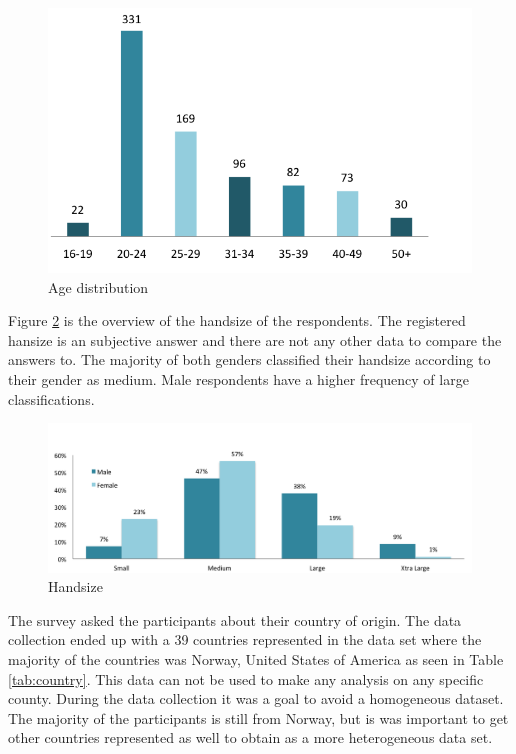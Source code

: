     \begin{figure}[H]
      \centering
      \includegraphics[scale=0.8]{pics/analysis/AgeDist.png}
      \caption{Age distribution}
      \label{fig:ageDistribution}
    \end{figure}

    Figure  \ref{fig:handsizepopulation} is the overview of the handsize of the respondents. The registered hansize is an subjective answer and there are not any other data to compare the answers to. The majority of both genders classified their handsize according to their gender as medium. Male respondents have a higher frequency of large classifications. 

    \begin{figure}[H]
      \centering
      \includegraphics[width=\textwidth]{pics/infographics/mobilesize.png}
      \caption{Handsize}
      \label{fig:handsizepopulation}
    \end{figure}

    The survey asked the participants about their country of origin. The data collection ended up with a 39 countries represented in the data set where the majority of the countries was Norway, United States of America as seen in Table \ref{tab:country}. This data can not be used to make any analysis on any specific county. During the data collection it was a goal to avoid a homogeneous dataset. The majority of the participants is still from Norway, but is was important to get other countries represented as well to obtain as a more heterogeneous data set. 

